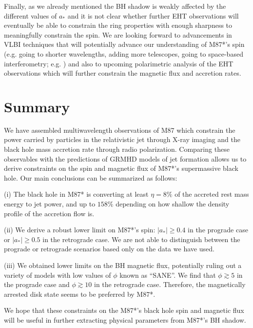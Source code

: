 \documentclass[twocolumn, linenumbers]{aastex62} %
\begin{document}
Finally, as we already mentioned the BH shadow is weakly affected by the different values of $a_*$ and it is not clear whether further EHT observations will eventually be able to constrain the ring properties with enough sharpness to meaningfully constrain the spin. We are looking forward to advancements in VLBI techniques that will potentially advance our understanding of M87*'s spin (e.g. going to shorter wavelengths, adding more telescopes, going to space-based interferometry; e.g. \citealt{Roelofs2019}) and also to upcoming polarimetric analysis of the EHT observations which will further constrain the magnetic flux and accretion rates.




\section{Summary}	\label{sec:summary}

We have assembled multiwavelength observations of M87 which constrain the power carried by particles in the relativistic jet through X-ray imaging and the black hole mass accretion rate through radio polarization. Comparing these observables with the predictions of GRMHD models of jet formation allows us to derive constraints on the spin and magnetic flux of M87*'s supermassive black hole. Our main conclusions can be summarized as follows:

(i) The black hole in M87* is converting at least $\eta=8\%$ of the accreted rest mass energy to jet power, and up to $158\%$ depending on how shallow the density profile of the accretion flow is.

(ii) We derive a robust lower limit on M87*'s spin: $|a_*| \geq 0.4$ in the prograde case or $|a_*| \geq 0.5$ in the retrograde case. We are not able to distinguish between the prograde or retrograde scenarios based only on the data we have used.

(iii) We obtained lower limits on the BH magnetic flux, potentially ruling out a variety of models with low values of $\phi$ known as ``SANE''. We find that $\phi \gtrsim 5$ in the prograde case and $\phi \gtrsim 10$ in the retrograde case. Therefore, the magnetically arrested disk state seems to be preferred by M87*.


We hope that these constraints on the M87*'s black hole spin and magnetic flux will be useful in further extracting physical parameters from M87*'s BH shadow.
\end{document}

